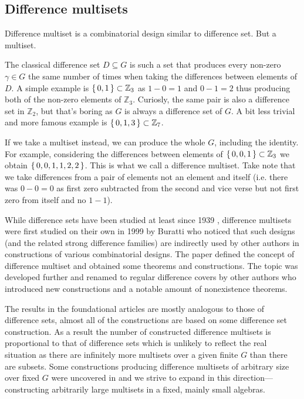 \subsection{Difference multisets}

    Difference multiset is a combinatorial design similar to difference set. But a multiset. 

    The classical difference set $D \subseteq G$ is such a set that produces every non-zero $\gamma \in G$ the same number of times when taking the differences between elements of $D$. A simple example is $\set{0,1} \subset \mathbb Z_3$ as $1-0=1$ and $0-1=2$ thus producing both of the non-zero elements of $\mathbb Z_3$. Curiosly, the same pair is also a difference set in $\mathbb Z_2$, but that's boring as $G$ is always a difference set of $G$. A bit less trivial and more famous example is $\set{0,1,3} \subset \mathbb Z_7$.

    If we take a multiset instead, we can produce the whole $G$, including the identity. For example, considering the differences between elements of $\set{0,0,1} \subset \mathbb Z_3$ we obtain $\set{0,0,1,1,2,2}$. This is what we call a difference multiset. Take note that we take differences from a pair of elements not an element and itself (i.e. there was $0-0=0$ as first zero subtracted from the second and vice verse but not first zero from itself and no $1-1$).

    While difference sets have been studied at least since 1939 \cite{bose1939construction}, difference multisets were first studied on their own in 1999 by Buratti \cite{buratti1999old} who noticed that such designs (and the related strong difference families) are indirectly used by other authors in constructions of various combinatorial designs. The paper defined the concept of difference multiset and obtained some theorems and constructions. The topic was developed further and renamed to regular difference covers by other authors \cite{arasu2005cyclic, arasu2005regular} who introduced new constructions and a notable amount of nonexistence theorems.

    The results in the foundational articles are mostly analogous to those of difference sets, almost all of the constructions are based on some difference set construction. As a result the number of constructed difference multisets is proportional to that of difference sets which is unlikely to reflect the real situation as there are infinitely more multisets over a given finite $G$ than there are subsets. Some constructions producing difference multisets of arbitrary size over fixed $G$ were uncovered in \cite{momihara2009strong} and we strive to expand in this direction---constructing arbitrarily large multisets in a fixed, mainly small algebras.

